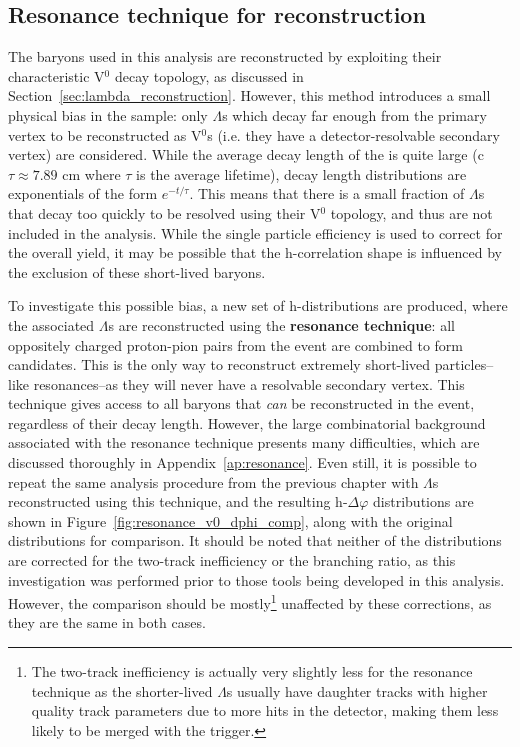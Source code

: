 \subsection{Resonance technique for \lmb reconstruction}
\label{sec:resonance_technique}

The \lmb baryons used in this analysis are reconstructed by exploiting their characteristic V$^0$ decay topology, as discussed in Section~\ref{sec:lambda_reconstruction}. However, this method introduces a small physical bias in the \lmb sample: only $\Lambda$s which decay far enough from the primary vertex to be reconstructed as V$^0$s (i.e. they have a detector-resolvable secondary vertex) are considered. While the average decay length of the \lmb is quite large (c$\tau \approx 7.89$ cm where $\tau$ is the average lifetime), decay length distributions are exponentials of the form $e^{-t/\tau}$. This means that there is a small fraction of $\Lambda$s that decay too quickly to be resolved using their V$^0$ topology, and thus are not included in the analysis. While the single particle \lmb efficiency is used to correct for the overall \lmb yield, it may be possible that the h-\lmb correlation shape is influenced by the exclusion of these short-lived \lmb baryons. 

To investigate this possible bias, a new set of h-\lmb distributions are produced, where the associated $\Lambda$s are reconstructed using the \textbf{resonance technique}: all oppositely charged proton-pion pairs from the event are combined to form \lmb candidates. This is the only way to reconstruct extremely short-lived particles--like resonances--as they will never have a resolvable secondary vertex.  This technique gives access to all \lmb baryons that \textit{can} be reconstructed in the event, regardless of their decay length. However, the large combinatorial background associated with the resonance technique presents many difficulties, which are discussed thoroughly in Appendix~\ref{ap:resonance}. Even still, it is possible to repeat the same analysis procedure from the previous chapter with $\Lambda$s reconstructed using this technique, and the resulting h-\lmb $\Delta\varphi$ distributions are shown in Figure~\ref{fig:resonance_v0_dphi_comp}, along with the original distributions for comparison. It should be noted that neither of the distributions are corrected for the two-track inefficiency or the branching ratio, as this investigation was performed prior to those tools being developed in this analysis. However, the comparison should be mostly\footnote{The two-track inefficiency is actually very slightly less for the resonance technique as the shorter-lived $\Lambda$s usually have daughter tracks with higher quality track parameters due to more hits in the detector, making them less likely to be merged with the trigger.} unaffected by these corrections, as they are the same in both cases.

